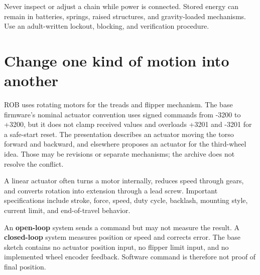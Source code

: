 \documentclass[11pt,openany]{book}
\begin{document}
\begin{safetybox}
Never inspect or adjust a chain while power is connected. Stored energy can remain in batteries, springs, raised structures, and gravity-loaded mechanisms. Use an adult-written lockout, blocking, and verification procedure.
\end{safetybox}


\chapter{Change one kind of motion into another}

ROB uses rotating motors for the treads and flipper mechanism. The base firmware's nominal actuator convention uses signed commands from -3200 to +3200, but it does not clamp received values and overloads +3201 and -3201 for a safe-start reset. The presentation describes an actuator moving the torso forward and backward, and elsewhere proposes an actuator for the third-wheel idea. Those may be revisions or separate mechanisms; the archive does not resolve the conflict.


A linear actuator often turns a motor internally, reduces speed through gears, and converts rotation into extension through a lead screw. Important specifications include stroke, force, speed, duty cycle, backlash, mounting style, current limit, and end-of-travel behavior.

\begin{conceptbox}
An \textbf{open-loop} system sends a command but may not measure the result. A \textbf{closed-loop} system measures position or speed and corrects error. The base sketch contains no actuator position input, no flipper limit input, and no implemented wheel encoder feedback. Software command is therefore not proof of final position.
\end{conceptbox}
\end{document}

